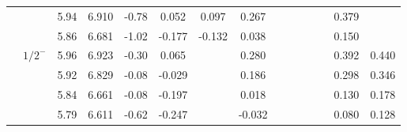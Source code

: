 \documentclass[prd,twocolumn,floatfix,nofootinbib]{revtex4}
\begin{document}
\begin{table*}[!htbp]
\begin{tabular}{cc|ccc|cccccccccc}
            &               &5.94   &6.910  &-0.78 &0.052 &0.097 &0.267 & & & & & &0.379 & \\
            &               &5.86   &6.681  &-1.02 &-0.177 &-0.132 &0.038 & & & & & &0.150 & \\
            &${1/2}^{-}$    &5.96   &6.923  &-0.30 &0.065 & &0.280 & & & & & &0.392 &0.440 \\
            &               &5.92   &6.829  &-0.08 &-0.029 & &0.186 & & & & & &0.298 &0.346 \\
            &               &5.84   &6.661  &-0.08 &-0.197 & &0.018 & & & & & &0.130 &0.178 \\
            &               &5.79   &6.611  &-0.62 &-0.247 & &-0.032 & & & & & &0.080 &0.128 \\  
        \bottomrule[0.5pt]\bottomrule[1.5pt]
    \end{tabular}
\end{table*}
\end{document}
